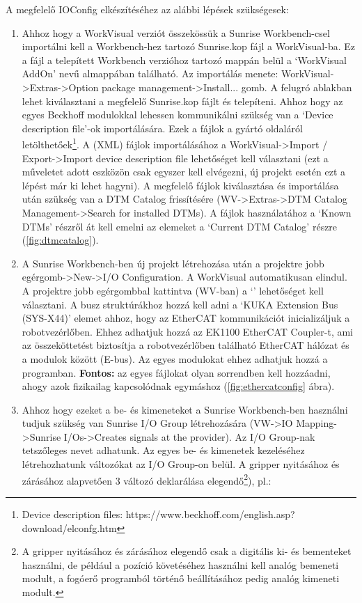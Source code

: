 \documentclass[../documentation.tex]{subfiles}
\begin{document}
A megfelelő IOConfig elkészítéséhez az alábbi lépések szükségesek:
\begin{enumerate}
	\item Ahhoz hogy a WorkVisual verziót összekössük a Sunrise Workbench-csel importálni kell a Workbench-hez tartozó Sunrise.kop fájl a WorkVisual-ba. Ez a fájl a telepített Workbench verzióhoz tartozó mappán belül a `WorkVisual AddOn' nevű almappában található. Az importálás menete: WorkVisual->Extras->Option package management->Install... gomb. A felugró ablakban lehet kiválasztani a megfelelő Sunrise.kop fájlt és telepíteni. Ahhoz hogy az egyes Beckhoff modulokkal lehessen kommunikálni szükség van a `Device description file'-ok importálására. Ezek a fájlok a gyártó oldaláról letölthetőek\footnote{Device description files: https://www.beckhoff.com/english.asp?download/elconfg.htm}. A (XML) fájlok importálásához a WorkVisual->Import / Export->Import device description file lehetőséget kell választani (ezt a műveletet adott eszközön csak egyszer kell elvégezni, új projekt esetén ezt a lépést már ki lehet hagyni). A megfelelő fájlok kiválasztása és importálása után szükség van a DTM Catalog frissítésére (WV->Extras->DTM Catalog Management->Search for installed DTMs). A fájlok használatához a `Known DTMs' részről át kell emelni az elemeket a `Current DTM Catalog' részre (\ref{fig:dtmcatalog}).
	\item A Sunrise Workbench-ben új projekt létrehozása után a projektre jobb egérgomb->New->I/O Configuration. A WorkVisual automatikusan elindul. A projektre jobb egérgombbal kattintva (WV-ban) a `' lehetőséget kell választani. A busz struktúrákhoz hozzá kell adni a `KUKA Extension Bus (SYS-X44)' elemet ahhoz, hogy az EtherCAT kommunikációt inicializáljuk a robotvezérlőben. Ehhez adhatjuk hozzá az EK1100 EtherCAT Coupler-t, ami az összeköttetést biztosítja a robotvezérlőben található EtherCAT hálózat és a modulok között (E-bus). Az egyes modulokat ehhez adhatjuk hozzá a programban. \textbf{Fontos:} az egyes fájlokat olyan sorrendben kell hozzáadni, ahogy azok fizikailag kapcsolódnak egymáshoz (\ref{fig:ethercatconfig} ábra).
	\item Ahhoz hogy ezeket a be- és kimeneteket a Sunrise Workbench-ben használni tudjuk szükség van Sunrise I/O Group létrehozására (VW->IO Mapping->Sunrise I/Os->Creates signals at the provider). Az I/O Group-nak tetszőleges nevet adhatunk. Az egyes be- és kimenetek kezeléséhez létrehozhatunk változókat az I/O Group-on belül. A gripper nyitásához és zárásához alapvetően 3 változó deklarálása elegendő\footnote{A gripper nyitásához és zárásához elegendő csak a digitális ki- és bementeket használni, de például a pozíció követéséhez használni kell analóg bemeneti modult, a fogóerő programból történő beállításához pedig analóg kimeneti modult.}), pl.:

\end{enumerate}
\end{document}
